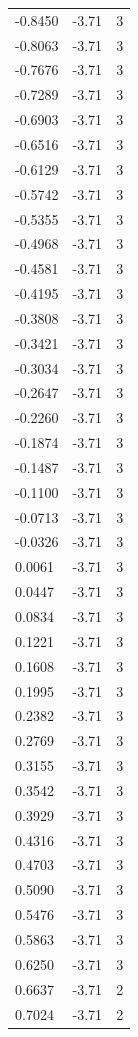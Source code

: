 \begin{longtable}{lrr}
  -0.8450 & -3.71 & 3 \\
  -0.8063 & -3.71 & 3 \\
  -0.7676 & -3.71 & 3 \\
  -0.7289 & -3.71 & 3 \\
  -0.6903 & -3.71 & 3 \\
  -0.6516 & -3.71 & 3 \\
  -0.6129 & -3.71 & 3 \\
  -0.5742 & -3.71 & 3 \\
  -0.5355 & -3.71 & 3 \\
  -0.4968 & -3.71 & 3 \\
  -0.4581 & -3.71 & 3 \\
  -0.4195 & -3.71 & 3 \\
  -0.3808 & -3.71 & 3 \\
  -0.3421 & -3.71 & 3 \\
  -0.3034 & -3.71 & 3 \\
  -0.2647 & -3.71 & 3 \\
  -0.2260 & -3.71 & 3 \\
  -0.1874 & -3.71 & 3 \\
  -0.1487 & -3.71 & 3 \\
  -0.1100 & -3.71 & 3 \\
  -0.0713 & -3.71 & 3 \\
  -0.0326 & -3.71 & 3 \\
  0.0061 & -3.71 & 3 \\
  0.0447 & -3.71 & 3 \\
  0.0834 & -3.71 & 3 \\
  0.1221 & -3.71 & 3 \\
  0.1608 & -3.71 & 3 \\
  0.1995 & -3.71 & 3 \\
  0.2382 & -3.71 & 3 \\
  0.2769 & -3.71 & 3 \\
  0.3155 & -3.71 & 3 \\
  0.3542 & -3.71 & 3 \\
  0.3929 & -3.71 & 3 \\
  0.4316 & -3.71 & 3 \\
  0.4703 & -3.71 & 3 \\
  0.5090 & -3.71 & 3 \\
  0.5476 & -3.71 & 3 \\
  0.5863 & -3.71 & 3 \\
  0.6250 & -3.71 & 3 \\
  0.6637 & -3.71 & 2 \\
  0.7024 & -3.71 & 2 \\

\end{longtable}
